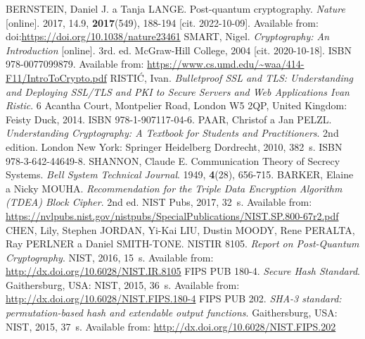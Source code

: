 

\begin{thebibliography}{99}
  BERNSTEIN, Daniel J. a Tanja LANGE. Post-quantum cryptography. \textit{Nature} [online]. 2017, 14.9, \textbf{2017}(549), 188-194 [cit. 2022-10-09]. Available from: doi:\url{https://doi.org/10.1038/nature23461}
  SMART, Nigel. \textit{Cryptography: An Introduction} [online]. 3rd. ed. McGraw-Hill College, 2004 [cit. 2020-10-18]. ISBN 978-0077099879. Available from: \url{https://www.cs.umd.edu/~waa/414-F11/IntroToCrypto.pdf}
  RISTIĆ, Ivan. \textit{Bulletproof SSL and TLS: Understanding and Deploying SSL/TLS and PKI to Secure Servers and Web Applications Ivan Ristic}. 6 Acantha Court, Montpelier Road, London W5 2QP, United Kingdom: Feisty Duck, 2014. ISBN 978-1-907117-04-6.
  PAAR, Christof a Jan PELZL. \textit{Understanding Cryptography: A Textbook for Students and Practitioners}. 2nd edition. London New York: Springer Heidelberg Dordrecht, 2010, 382~s. ISBN 978-3-642-44649-8.
  SHANNON, Claude E. Communication Theory of Secrecy Systems. \textit{Bell System Technical Journal}. 1949, \textbf{4}(28), 656-715.
  BARKER, Elaine a Nicky MOUHA. \textit{Recommendation for the Triple Data Encryption Algorithm (TDEA) Block Cipher}. 2nd ed. NIST Pubs, 2017, 32~s. Available from: \url{https://nvlpubs.nist.gov/nistpubs/SpecialPublications/NIST.SP.800-67r2.pdf}
  CHEN, Lily, Stephen JORDAN, Yi-Kai LIU, Dustin MOODY, Rene PERALTA, Ray PERLNER a Daniel SMITH-TONE. NISTIR 8105. \textit{Report on Post-Quantum Cryptography}. NIST, 2016, 15~s. Available from: \url{http://dx.doi.org/10.6028/NIST.IR.8105}
  FIPS PUB 180-4. \textit{Secure Hash Standard}. Gaithersburg, USA: NIST, 2015, 36~s. Available from: \url{http://dx.doi.org/10.6028/NIST.FIPS.180-4}
  FIPS PUB 202. \textit{SHA-3 standard: permutation-based hash and extendable output functions}. Gaithersburg, USA: NIST, 2015, 37~s. Available from: \url{http://dx.doi.org/10.6028/NIST.FIPS.202}

\end{thebibliography}
